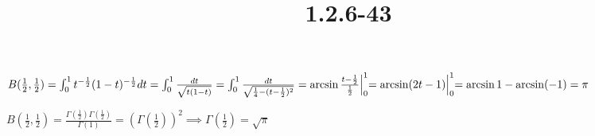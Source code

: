 \documentclass{article}
\title{1.2.6-43}
\begin{document}
\maketitle

\( B(\frac{1}{2}, \frac{1}{2}) = \int_0^1 t^{-\frac{1}{2}}(1-t)^{-\frac{1}{2}}dt = \int_0^1 \frac{dt}{\sqrt{t(1-t)}} = \int_0^1 \frac{dt}{\sqrt{\frac{1}{4}- (t-\frac{1}{2})^2}} = \arcsin \frac{t-\frac{1}{2}}{\frac{1}{2}} \Bigl|_0^1 = \arcsin (2t-1) \Bigl|_0^1 = \arcsin 1 - \arcsin (-1) = \pi \)

\( B(\frac{1}{2}, \frac{1}{2}) = \frac{\Gamma(\frac{1}{2}) \Gamma(\frac{1}{2})}{\Gamma(1)} = (\Gamma(\frac{1}{2}))^2 \implies \Gamma(\frac{1}{2}) = \sqrt{\pi} \)
\end{document}
